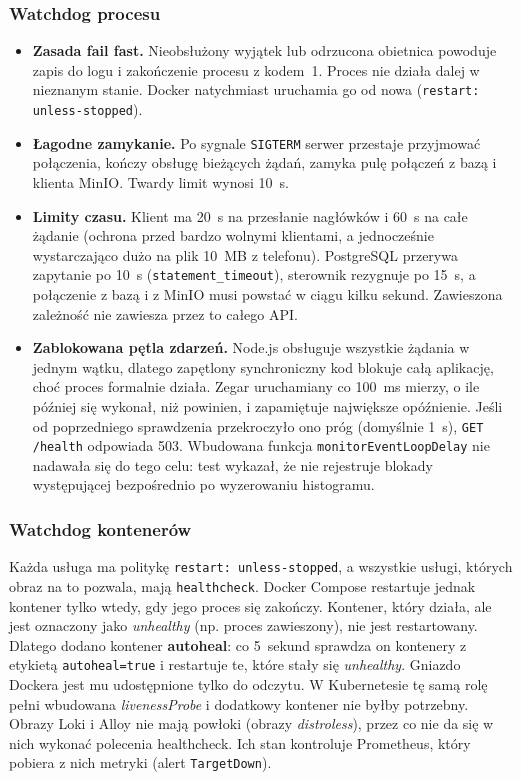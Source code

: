 \subsubsection{Watchdog procesu}

\begin{itemize}
  \item \textbf{Zasada fail fast.} Nieobsłużony wyjątek lub odrzucona obietnica
        powoduje zapis do logu i zakończenie procesu z kodem~1. Proces nie
        działa dalej w nieznanym stanie. Docker natychmiast uruchamia go od
        nowa (\texttt{restart: unless-stopped}).
  \item \textbf{Łagodne zamykanie.} Po sygnale \texttt{SIGTERM} serwer przestaje
        przyjmować połączenia, kończy obsługę bieżących żądań, zamyka pulę
        połączeń z bazą i klienta MinIO. Twardy limit wynosi 10~s.
  \item \textbf{Limity czasu.} Klient ma 20~s na przesłanie nagłówków i 60~s na
        całe żądanie (ochrona przed bardzo wolnymi klientami, a jednocześnie
        wystarczająco dużo na plik 10~MB z telefonu). PostgreSQL przerywa
        zapytanie po 10~s (\texttt{statement\_timeout}), sterownik rezygnuje
        po 15~s, a połączenie z bazą i z MinIO musi powstać w ciągu kilku
        sekund. Zawieszona zależność nie zawiesza przez to całego API.
  \item \textbf{Zablokowana pętla zdarzeń.} Node.js obsługuje wszystkie
        żądania w jednym wątku, dlatego zapętlony synchroniczny kod blokuje całą
        aplikację, choć proces formalnie działa. Zegar uruchamiany co 100~ms
        mierzy, o ile później się wykonał, niż powinien, i zapamiętuje
        największe opóźnienie. Jeśli od poprzedniego sprawdzenia przekroczyło
        ono próg (domyślnie 1~s), \texttt{GET /health} odpowiada 503.
        Wbudowana funkcja \texttt{monitorEventLoopDelay} nie nadawała się do
        tego celu: test wykazał, że nie rejestruje blokady występującej
        bezpośrednio po wyzerowaniu histogramu.
\end{itemize}

\subsubsection{Watchdog kontenerów}

Każda usługa ma politykę \texttt{restart: unless-stopped}, a wszystkie usługi,
których obraz na to pozwala, mają \texttt{healthcheck}. Docker Compose
restartuje jednak kontener tylko wtedy, gdy jego proces się zakończy.
Kontener, który działa, ale jest oznaczony jako \emph{unhealthy} (np. proces
zawieszony), nie jest restartowany. Dlatego dodano kontener
\textbf{autoheal}: co 5~sekund sprawdza on kontenery z etykietą
\texttt{autoheal=true} i restartuje te, które stały się \emph{unhealthy}.
Gniazdo Dockera jest mu udostępnione tylko do odczytu. W Kubernetesie tę samą
rolę pełni wbudowana \emph{livenessProbe} i dodatkowy kontener nie byłby
potrzebny. Obrazy Loki i Alloy nie mają powłoki (obrazy \emph{distroless}),
przez co nie da się w nich wykonać polecenia healthcheck. Ich stan kontroluje
Prometheus, który pobiera z nich metryki (alert \texttt{TargetDown}).

